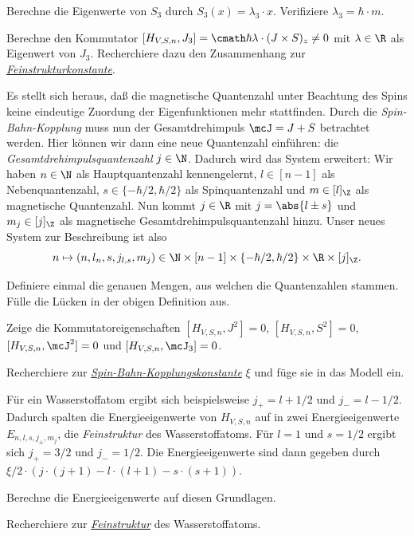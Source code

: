 \documentclass{subfiles}
\begin{document}
    \begin{Aufgabe}
        \nr{} Berechne die Eigenwerte von $S_3$ durch $S_3(x) = \lambda_3\cdot x$. Verifiziere $\lambda_3 = \hbar\cdot m$. 

        \nr{} Berechne den Kommutator $[H_{V,S,n},J_3] = \cmath\hbar\lambda\cdot (J\times S)_z\neq 0$ mit $\lambda\in\R$ als Eigenwert von $J_3$. Recherchiere dazu den Zusammenhang zur \href{https://en.wikipedia.org/wiki/Fine-structure_constant}{\emph{Feinstrukturkonstante}}.
    \end{Aufgabe}
    Es stellt sich heraus, daß die magnetische Quantenzahl unter Beachtung des Spins keine eindeutige Zuordung der Eigenfunktionen mehr stattfinden. Durch die \emph{Spin-Bahn-Kopplung} muss nun der Gesamtdrehimpuls $\mcJ = J + S$ betrachtet werden. Hier können wir dann eine neue Quantenzahl einführen: die \emph{Gesamtdrehimpulsquantenzahl} $j\in\N$. Dadurch wird das System erweitert: Wir haben $n\in\N$ als Hauptquantenzahl kennengelernt, $l \in [n - 1]$ als Nebenquantenzahl, $s\in\{-\hbar/2,\hbar/2\}$ als Spinquantenzahl und $m\in [l]_\Z$ als magnetische Quantenzahl. Nun kommt $j\in\R$ mit $j = \abs{l\pm s}$ und $m_j\in [j]_\Z$ als magnetische Gesamtdrehimpulsquantenzahl hinzu. Unser neues System zur Beschreibung ist also
    \[
        n\mapsto (n,l_n,s,j_{l,s},m_j) \in\N\times [n-1]\times\{-\hbar/2,\hbar/2\}\times\R\times [j]_\Z.
    \]
    \begin{Aufgabe}
        \nr{} Definiere einmal die genauen Mengen, aus welchen die Quantenzahlen stammen. Fülle die Lücken in der obigen Definition aus.

        \nr{} Zeige die Kommutatoreigenschaften $[H_{V,S,n},J^2] = 0$, $[H_{V,S,n},S^2] = 0$, $[H_{V,S,n},\mcJ^2] = 0$ und $[H_{V,S,n},\mcJ_3] = 0$.  

        \nr{} Recherchiere zur \href{https://de.wikipedia.org/wiki/Spin-Bahn-Kopplung}{\emph{Spin-Bahn-Kopplungskonstante}} $\xi$ und füge sie in das Modell ein.
    \end{Aufgabe}
    Für ein Wasserstoffatom ergibt sich beispielsweise $j_+ = l + 1/2$ und $j_- = l - 1/2$. Dadurch spalten die Energieeigenwerte von $H_{V,S,n}$ auf in zwei Energieeigenwerte $E_{n,l,s,j_\pm,m_j}$, die \emph{Feinstruktur} des Wasserstoffatoms. Für $l = 1$ und $s = 1/2$ ergibt sich $j_+ = 3/2$ und $j_- = 1/2$. Die Energieeigenwerte sind dann gegeben durch $\xi/2\cdot (j\cdot(j+1) - l\cdot(l + 1) - s\cdot (s + 1))$. 
    \begin{Aufgabe}
        \nr{} Berechne die Energieeigenwerte auf diesen Grundlagen.

        \nr{} Recherchiere zur \href{https://de.wikipedia.org/wiki/Feinstruktur_(Physik)}{\emph{Feinstruktur}} des Wasserstoffatoms.
    \end{Aufgabe}
\end{document}
